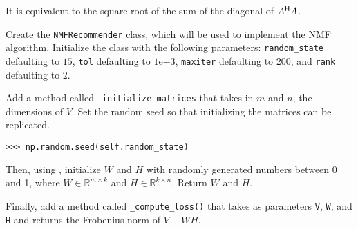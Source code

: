 It is equivalent to the square root of the sum of the diagonal of $A^{\mathsf H} A$.



\begin{problem}
Create the \texttt{NMFRecommender} class, which will be used to implement the NMF algorithm.
Initialize the class with the following parameters:
\texttt{random\_state} defaulting to $15$,
\texttt{tol} defaulting to $1\mathrm{e}{-3}$, \texttt{maxiter} defaulting to $200$, and \texttt{rank} defaulting to $2$.


Add a method called \texttt{\_initialize\_matrices} that takes in $m$ and $n$, the dimensions of $V$.
Set the random seed so that initializing the matrices can be replicated.
\begin{lstlisting}
>>> np.random.seed(self.random_state)
\end{lstlisting}
Then, using , initialize $W$ and $H$ with randomly generated numbers between 0 and 1, where $W\in\mathbb{R}^{m\times k}$ and $H\in\mathbb{R}^{k\times n}$.
Return $W$ and $H$.

Finally, add a method called \texttt{\_compute\_loss()} that takes as parameters \texttt{V}, \texttt{W}, and \texttt{H} and returns the Frobenius norm of $V-WH$.
\end{problem}

%
%
%



